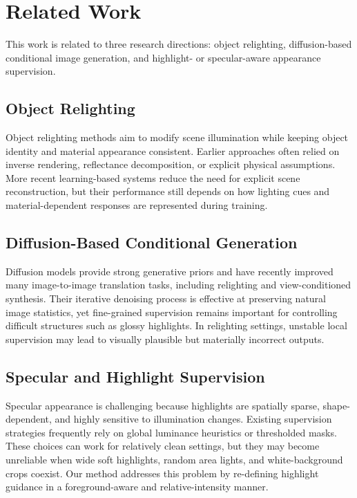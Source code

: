 \documentclass[UTF8,a4paper]{ctexart}
\begin{document}
\section{Related Work}

This work is related to three research directions: object relighting, diffusion-based conditional image generation, and highlight- or specular-aware appearance supervision.

\subsection{Object Relighting}

Object relighting methods aim to modify scene illumination while keeping object identity and material appearance consistent. Earlier approaches often relied on inverse rendering, reflectance decomposition, or explicit physical assumptions. More recent learning-based systems reduce the need for explicit scene reconstruction, but their performance still depends on how lighting cues and material-dependent responses are represented during training.

\subsection{Diffusion-Based Conditional Generation}

Diffusion models provide strong generative priors and have recently improved many image-to-image translation tasks, including relighting and view-conditioned synthesis. Their iterative denoising process is effective at preserving natural image statistics, yet fine-grained supervision remains important for controlling difficult structures such as glossy highlights. In relighting settings, unstable local supervision may lead to visually plausible but materially incorrect outputs.

\subsection{Specular and Highlight Supervision}

Specular appearance is challenging because highlights are spatially sparse, shape-dependent, and highly sensitive to illumination changes. Existing supervision strategies frequently rely on global luminance heuristics or thresholded masks. These choices can work for relatively clean settings, but they may become unreliable when wide soft highlights, random area lights, and white-background crops coexist. Our method addresses this problem by re-defining highlight guidance in a foreground-aware and relative-intensity manner.
\end{document}
